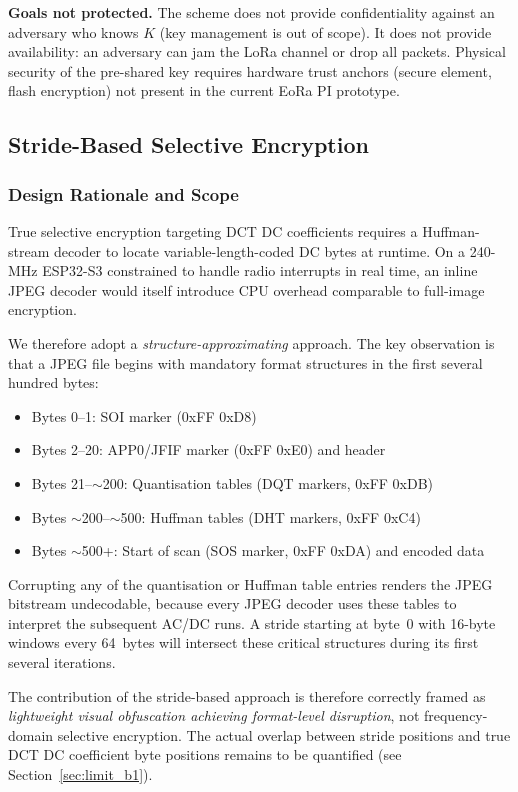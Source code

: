 \documentclass[journal]{IEEEtran}
\begin{document}
\textbf{Goals not protected.}  The scheme does not provide confidentiality
against an adversary who knows $K$ (key management is out of scope).  It does
not provide availability: an adversary can jam the LoRa channel or drop all
packets.  Physical security of the pre-shared key requires hardware trust
anchors (secure element, flash encryption) not present in the current EoRa PI
prototype.

\subsection{Stride-Based Selective Encryption}
\label{sec:sel_enc}

\subsubsection{Design Rationale and Scope}

True selective encryption targeting DCT DC coefficients requires a
Huffman-stream decoder to locate variable-length-coded DC bytes at runtime.
On a 240-MHz ESP32-S3 constrained to handle radio interrupts in real time, an
inline JPEG decoder would itself introduce CPU overhead comparable to
full-image encryption.

We therefore adopt a \emph{structure-approximating} approach.  The key
observation is that a JPEG file begins with mandatory format structures in the
first several hundred bytes:
\begin{itemize}
  \item Bytes 0--1: SOI marker (0xFF 0xD8)
  \item Bytes 2--20: APP0/JFIF marker (0xFF 0xE0) and header
  \item Bytes 21--$\sim$200: Quantisation tables (DQT markers, 0xFF 0xDB)
  \item Bytes $\sim$200--$\sim$500: Huffman tables (DHT markers, 0xFF 0xC4)
  \item Bytes $\sim$500+: Start of scan (SOS marker, 0xFF 0xDA) and encoded data
\end{itemize}
Corrupting any of the quantisation or Huffman table entries renders the JPEG
bitstream undecodable, because every JPEG decoder uses these tables to interpret
the subsequent AC/DC runs.  A stride starting at byte~0 with 16-byte windows
every 64~bytes will intersect these critical structures during its first several
iterations.

The contribution of the stride-based approach is therefore correctly framed as
\emph{lightweight visual obfuscation achieving format-level disruption}, not
frequency-domain selective encryption.  The actual overlap between stride
positions and true DCT DC coefficient byte positions remains to be quantified
(see Section~\ref{sec:limit_b1}).
\end{document}
